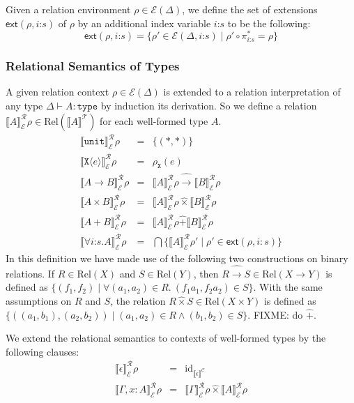 \documentclass[natbib,preprint]{sigplanconf}
\newcommand{\sepbar}{\mathrel|}
\newcommand{\Rel}{\mathrm{Rel}}
\newcommand{\relArrow}{\mathrel{\widehat\to}}
\newcommand{\relTimes}{\mathrel{\widehat\times}}
\newcommand{\relSum}{\mathrel{\widehat+}}
\newcommand{\id}{\mathrm{id}}
\newcommand{\sortType}{\texttt{type}}
\newcommand{\tyUnit}{\texttt{unit}}
\newcommand{\tyPrim}[2]{\texttt{#1}\langle #2 \rangle}
\newcommand{\tyPrimNm}[1]{\texttt{#1}}
\newcommand{\tyArr}{\to}
\newcommand{\tyProduct}{\times}
\newcommand{\relEnv}[1]{\mathcal{#1}}
\newcommand{\tySem}[1]{\llbracket #1 \rrbracket^{\mathcal{T}}}
\newcommand{\ctxtSem}[1]{\llbracket #1 \rrbracket^{\mathcal{C}}}
\newcommand{\rsem}[3]{\llbracket #1 \rrbracket^{\mathcal{R}}_{#2}{#3}}
\newcommand{\extends}[2]{\mathsf{ext}(#1,#2)}
\begin{document}
Given a relation environment $\rho \in \relEnv{E}(\Delta)$, we define
the set of extensions $\extends{\rho}{i\mathord:s}$ of $\rho$ by an
additional index variable $i\mathord:s$ to be the following:
\begin{displaymath}
  \extends{\rho}{i\mathord:s} = \{ \rho' \in \relEnv{E}(\Delta,i\mathord:s) \sepbar \rho' \circ \pi^*_{i\mathord:s} = \rho \}
\end{displaymath}

\subsubsection{Relational Semantics of Types}

A given relation context $\rho \in \relEnv{E}(\Delta)$ is extended to
a relation interpretation of any type $\Delta \vdash A : \sortType$ by
induction its derivation. So we define a relation
$\rsem{A}{\relEnv{E}}{\rho} \in \Rel(\tySem{A})$ for each well-formed
type $A$.
\begin{eqnarray*}
  \rsem{\tyUnit}{\relEnv{E}}\rho & = & \{(*,*)\} \\
  \rsem{\tyPrim{X}{e}}{\relEnv{E}}\rho & = & \rho_{\tyPrimNm{X}}(e) \\
  \rsem{A \tyArr B}{\relEnv{E}}\rho & = & \rsem{A}{\relEnv{E}}\rho \relArrow \rsem{B}{\relEnv{E}}\rho \\
  \rsem{A \tyProduct B}{\relEnv{E}}\rho & = & \rsem{A}{\relEnv{E}}\rho \relTimes \rsem{B}{\relEnv{E}}\rho \\
  \rsem{A + B}{\relEnv{E}}\rho & = & \rsem{A}{\relEnv{E}}\rho \relSum \rsem{B}{\relEnv{E}}\rho \\
  \rsem{\forall i\mathord:s.A}{\relEnv{E}}\rho & = & \bigcap\{ \rsem{A}{\relEnv{E}}\rho' \sepbar \rho' \in \extends{\rho}{i:s} \}
\end{eqnarray*}
In this definition we have made use of the following two constructions
on binary relations. If $R \in \Rel(X)$ and $S \in \Rel(Y)$, then $R
\relArrow S \in \Rel(X \to Y)$ is defined as $\{ (f_1,f_2) \sepbar
\forall (a_1,a_2) \in R.\ (f_1a_1,f_2a_2) \in S \}$. With the same
assumptions on $R$ and $S$, the relation $R \relTimes S \in \Rel(X
\times Y)$ is defined as $\{ ((a_1,b_1),(a_2,b_2)) \sepbar (a_1,a_2)
\in R \land (b_1,b_2) \in S \}$. FIXME: do $\relSum$.

We extend the relational semantics to contexts of well-formed types by
the following clauses:
\begin{eqnarray*}
  \rsem{\epsilon}{\relEnv{E}}{\rho} & = & \id_{\ctxtSem{\epsilon}} \\
  \rsem{\Gamma, x : A}{\relEnv{E}}{\rho} & = & \rsem{\Gamma}{\relEnv{E}}\rho \relTimes \rsem{A}{\relEnv{E}}\rho
\end{eqnarray*}
\end{document}
